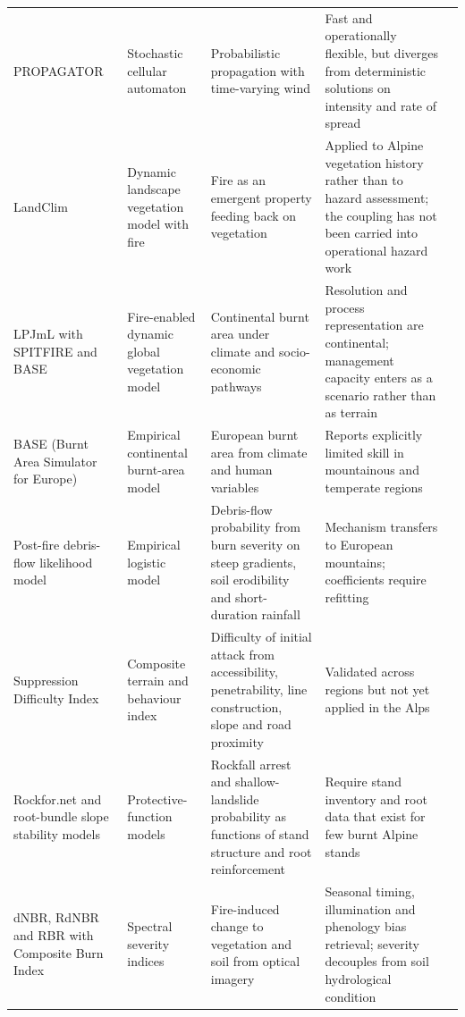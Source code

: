 \documentclass[11pt,a4paper]{article}
\begin{document}
{\begin{xltabular}{\textwidth}{@{}>{\raggedright\arraybackslash}p{2.2cm} >{\raggedright\arraybackslash}p{2.1cm} >{\raggedright\arraybackslash}X >{\raggedright\arraybackslash}X >{\raggedright\arraybackslash}p{2.5cm}@{}}
PROPAGATOR & Stochastic cellular automaton & Probabilistic propagation with time-varying wind & Fast and operationally flexible, but diverges from deterministic solutions on intensity and rate of spread & \citealp{malanchini_modeling_2025} \\
LandClim & Dynamic landscape vegetation model with fire & Fire as an emergent property feeding back on vegetation & Applied to Alpine vegetation history rather than to hazard assessment; the coupling has not been carried into operational hazard work & \citealp{schumacher_relative_2006, colombaroli_species_2010} \\
LPJmL with SPITFIRE and BASE & Fire-enabled dynamic global vegetation model & Continental burnt area under climate and socio-economic pathways & Resolution and process representation are continental; management capacity enters as a scenario rather than as terrain & \citealp{billing_future_2026} \\
BASE (Burnt Area Simulator for Europe) & Empirical continental burnt-area model & European burnt area from climate and human variables & Reports explicitly limited skill in mountainous and temperate regions & \citealp{forrest_understanding_2024} \\
Post-fire debris-flow likelihood model & Empirical logistic model & Debris-flow probability from burn severity on steep gradients, soil erodibility and short-duration rainfall & Mechanism transfers to European mountains; coefficients require refitting & \citealp{diakakis_exploring_2023} \\
Suppression Difficulty Index & Composite terrain and behaviour index & Difficulty of initial attack from accessibility, penetrability, line construction, slope and road proximity & Validated across regions but not yet applied in the Alps & \citealp{cardil_assessing_2025} \\
Rockfor.net and root-bundle slope stability models & Protective-function models & Rockfall arrest and shallow-landslide probability as functions of stand structure and root reinforcement & Require stand inventory and root data that exist for few burnt Alpine stands & \citealp{maringer_temporal_2016, moos_climate_2021, gehring_shallow_2019} \\
dNBR, RdNBR and RBR with Composite Burn Index & Spectral severity indices & Fire-induced change to vegetation and soil from optical imagery & Seasonal timing, illumination and phenology bias retrieval; severity decouples from soil hydrological condition & \citealp{morresi_mapping_2022, malandra_burn_2022, negri_wildfire_2026} \\
\end{xltabular}
}
\end{document}
